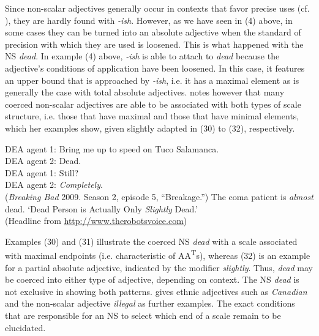 \documentclass[output=paper
,modfonts
,nonflat]{langsci/langscibook}
\begin{document}
Since non-scalar adjectives generally occur in contexts that favor precise uses (cf. \citealt[95--96]{Burnett2017}), they are hardly found with \textit{-ish}. However, as we have seen in (4) above, in some cases they can be turned into an absolute adjective when the standard of precision with which they are used is loosened. This is what happened with the NS \textit{dead}. In example (4) above, \textit{-ish} is able to attach to \textit{dead} because the adjective's conditions of application have been loosened. In this case, it features an upper bound that is approached by \textit{-ish}, i.e. it has a maximal element as is generally the case with total absolute adjectives. \textcite[112--113]{Burnett2017} notes however that many coerced non-scalar adjectives are able to be associated with both types of scale structure, i.e. those that have maximal and those that have minimal elements, which her examples show, given slightly adapted in (30) to (32), respectively.

\ea
	    DEA agent 1: Bring me up to speed on Tuco Salamanca. \\
		DEA agent 2: Dead. \\
		DEA agent 1: Still? \\
		DEA agent 2: \textit{Completely}. \\
		(\textit{Breaking Bad} 2009. Season 2, episode 5, ``Breakage.'')
\z
\ea
	The coma patient is \textit{almost} dead.
\z
\ea
	`Dead Person is Actually Only \textit{Slightly} Dead.' \\
		(Headline from \url{http://www.therobotsvoice.com})
\z

Examples (30) and (31) illustrate the coerced NS \textit{dead} with a scale associated with maximal endpoints (i.e. characteristic of AA\textsuperscript{T}s), whereas (32) is an example for a partial absolute adjective, indicated by the modifier \textit{slightly}. Thus, \textit{dead} may be coerced into either type of adjective, depending on context. The NS \textit{dead} is not exclusive in showing both patterns. \textcite[113]{Burnett2017} gives ethnic adjectives such as \textit{Canadian} and the non-scalar adjective \textit{illegal} as further examples. The exact conditions that are responsible for an NS to select which end of a scale remain to be elucidated.
\end{document}
